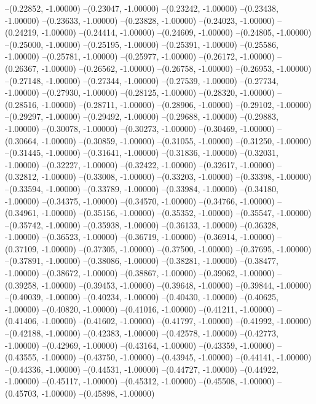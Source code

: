--(0.22852, -1.00000)
--(0.23047, -1.00000)
--(0.23242, -1.00000)
--(0.23438, -1.00000)
--(0.23633, -1.00000)
--(0.23828, -1.00000)
--(0.24023, -1.00000)
--(0.24219, -1.00000)
--(0.24414, -1.00000)
--(0.24609, -1.00000)
--(0.24805, -1.00000)
--(0.25000, -1.00000)
--(0.25195, -1.00000)
--(0.25391, -1.00000)
--(0.25586, -1.00000)
--(0.25781, -1.00000)
--(0.25977, -1.00000)
--(0.26172, -1.00000)
--(0.26367, -1.00000)
--(0.26562, -1.00000)
--(0.26758, -1.00000)
--(0.26953, -1.00000)
--(0.27148, -1.00000)
--(0.27344, -1.00000)
--(0.27539, -1.00000)
--(0.27734, -1.00000)
--(0.27930, -1.00000)
--(0.28125, -1.00000)
--(0.28320, -1.00000)
--(0.28516, -1.00000)
--(0.28711, -1.00000)
--(0.28906, -1.00000)
--(0.29102, -1.00000)
--(0.29297, -1.00000)
--(0.29492, -1.00000)
--(0.29688, -1.00000)
--(0.29883, -1.00000)
--(0.30078, -1.00000)
--(0.30273, -1.00000)
--(0.30469, -1.00000)
--(0.30664, -1.00000)
--(0.30859, -1.00000)
--(0.31055, -1.00000)
--(0.31250, -1.00000)
--(0.31445, -1.00000)
--(0.31641, -1.00000)
--(0.31836, -1.00000)
--(0.32031, -1.00000)
--(0.32227, -1.00000)
--(0.32422, -1.00000)
--(0.32617, -1.00000)
--(0.32812, -1.00000)
--(0.33008, -1.00000)
--(0.33203, -1.00000)
--(0.33398, -1.00000)
--(0.33594, -1.00000)
--(0.33789, -1.00000)
--(0.33984, -1.00000)
--(0.34180, -1.00000)
--(0.34375, -1.00000)
--(0.34570, -1.00000)
--(0.34766, -1.00000)
--(0.34961, -1.00000)
--(0.35156, -1.00000)
--(0.35352, -1.00000)
--(0.35547, -1.00000)
--(0.35742, -1.00000)
--(0.35938, -1.00000)
--(0.36133, -1.00000)
--(0.36328, -1.00000)
--(0.36523, -1.00000)
--(0.36719, -1.00000)
--(0.36914, -1.00000)
--(0.37109, -1.00000)
--(0.37305, -1.00000)
--(0.37500, -1.00000)
--(0.37695, -1.00000)
--(0.37891, -1.00000)
--(0.38086, -1.00000)
--(0.38281, -1.00000)
--(0.38477, -1.00000)
--(0.38672, -1.00000)
--(0.38867, -1.00000)
--(0.39062, -1.00000)
--(0.39258, -1.00000)
--(0.39453, -1.00000)
--(0.39648, -1.00000)
--(0.39844, -1.00000)
--(0.40039, -1.00000)
--(0.40234, -1.00000)
--(0.40430, -1.00000)
--(0.40625, -1.00000)
--(0.40820, -1.00000)
--(0.41016, -1.00000)
--(0.41211, -1.00000)
--(0.41406, -1.00000)
--(0.41602, -1.00000)
--(0.41797, -1.00000)
--(0.41992, -1.00000)
--(0.42188, -1.00000)
--(0.42383, -1.00000)
--(0.42578, -1.00000)
--(0.42773, -1.00000)
--(0.42969, -1.00000)
--(0.43164, -1.00000)
--(0.43359, -1.00000)
--(0.43555, -1.00000)
--(0.43750, -1.00000)
--(0.43945, -1.00000)
--(0.44141, -1.00000)
--(0.44336, -1.00000)
--(0.44531, -1.00000)
--(0.44727, -1.00000)
--(0.44922, -1.00000)
--(0.45117, -1.00000)
--(0.45312, -1.00000)
--(0.45508, -1.00000)
--(0.45703, -1.00000)
--(0.45898, -1.00000)
